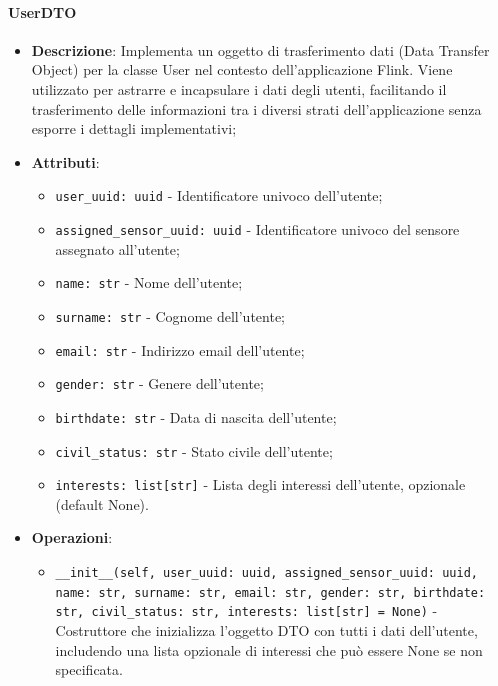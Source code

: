 \documentclass[10pt]{article}
\begin{document}
    \paragraph{UserDTO}
    \begin{itemize} 
    \item \textbf{Descrizione}: Implementa un oggetto di trasferimento dati (Data Transfer Object) per la classe User nel contesto dell'applicazione Flink. Viene utilizzato per astrarre e incapsulare i dati degli utenti, facilitando il trasferimento delle informazioni tra i diversi strati dell'applicazione senza esporre i dettagli implementativi;
    \item \textbf{Attributi}:
    \begin{itemize}
        \item \texttt{user\_uuid: uuid} - Identificatore univoco dell'utente;
        \item \texttt{assigned\_sensor\_uuid: uuid} - Identificatore univoco del sensore assegnato all'utente;
        \item \texttt{name: str} - Nome dell'utente;
        \item \texttt{surname: str} - Cognome dell'utente;
        \item \texttt{email: str} - Indirizzo email dell'utente;
        \item \texttt{gender: str} - Genere dell'utente;
        \item \texttt{birthdate: str} - Data di nascita dell'utente;
        \item \texttt{civil\_status: str} - Stato civile dell'utente;
        \item \texttt{interests: list[str]} - Lista degli interessi dell'utente, opzionale (default None).
    \end{itemize}
    
    \item \textbf{Operazioni}:
    \begin{itemize}
        \item \texttt{\_\_init\_\_(self, user\_uuid: uuid, assigned\_sensor\_uuid: uuid, name: str, surname: str, email: str, gender: str, birthdate: str, civil\_status: str, interests: list[str] = None)} - Costruttore che inizializza l'oggetto DTO con tutti i dati dell'utente, includendo una lista opzionale di interessi che può essere None se non specificata.
    \end{itemize}
    \end{itemize}
\end{document}
